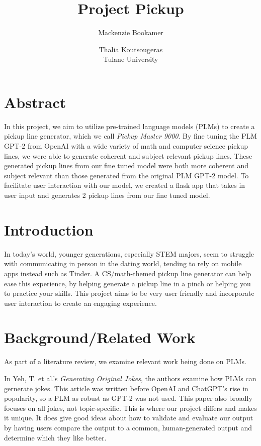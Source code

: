 \documentclass[12pt,reqno]{amsart}
\title{Project Pickup}
\author{Mackenzie Bookamer \and Thalia Koutsougeras\\Tulane University}
\theoremstyle{plain}
\theoremstyle{definition}
\theoremstyle{remark}
\begin{document}
\maketitle

\section{Abstract}
In this project, we aim to utilize pre-trained language models (PLMs) to create a pickup line generator, which we call \textit{Pickup Master 9000}. By fine tuning the PLM GPT-2 from OpenAI with a wide variety of math and computer science pickup lines, we were able to generate coherent and subject relevant pickup lines. These generated pickup lines from our fine tuned model were both more coherent and subject relevant than those generated from the original PLM GPT-2 model. To facilitate user interaction with our model, we created a flask app that takes in user input and generates 2 pickup lines from our fine tuned model. 

\section{Introduction}
In today’s world, younger generations, especially STEM majors, seem to struggle with communicating in person in the dating world, tending to rely on mobile apps instead such as Tinder. A CS/math-themed pickup line generator can help ease this experience, by helping generate a pickup line in a pinch or helping you to practice your skills. This project aims to be very user friendly and incorporate user interaction to create an engaging experience. 

\section{Background/Related Work}
As part of a literature review, we examine relevant work being done on PLMs.

In Yeh, T. et al.'s \textit{Generating Original Jokes}\cite{yeh2018generating}, the authors examine how PLMs can gernerate jokes. This article was written before OpenAI and ChatGPT’s rise in popularity, so a PLM as robust as GPT-2 was not used. This paper also broadly focuses on all jokes, not topic-specific. This is where our project differs and makes it unique. It does give good ideas about how to validate and evaluate our output by having users compare the output to a common, human-generated output and determine which they like better. 
\end{document}
